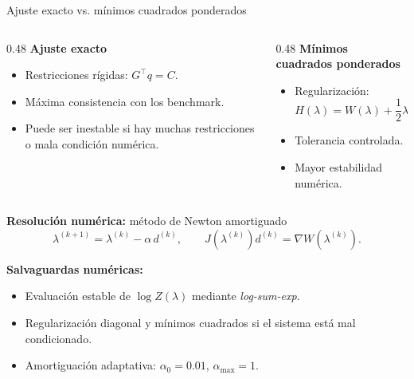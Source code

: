 \documentclass[8pt]{beamer}
\begin{document}
\begin{frame}{Ajuste exacto vs. mínimos cuadrados ponderados}
    \begin{columns}[T]
    \begin{column}{0.48\textwidth}
    \textbf{Ajuste exacto}
    \begin{itemize}
        \item Restricciones rígidas: $G^\top q = C$.
        \item Máxima consistencia con los benchmark.
        \item Puede ser inestable si hay muchas restricciones o mala condición numérica.
    \end{itemize}
    \end{column}
    \begin{column}{0.48\textwidth}
    \textbf{Mínimos cuadrados ponderados}
    \begin{itemize}
        \item Regularización:
        \[
            H(\lambda) = W(\lambda) + \frac{1}{2}\lambda^\top\Omega\lambda.
        \]
        \item Tolerancia controlada.
        \item Mayor estabilidad numérica.
    \end{itemize}
    \end{column}
    \end{columns}
    \pause
    
    \vspace{0.25cm}
    \textbf{Resolución numérica:} método de Newton amortiguado
    \[
        \lambda^{(k+1)} = \lambda^{(k)} - \alpha\, d^{(k)}, \qquad
        J(\lambda^{(k)})d^{(k)} = \nabla W(\lambda^{(k)}).
    \]
    \pause
    
    \textbf{Salvaguardas numéricas:}
    \begin{itemize}
        \item Evaluación estable de $\log Z(\lambda)$ mediante \textit{log-sum-exp}.
        \item Regularización diagonal y mínimos cuadrados si el sistema está mal condicionado.
        \item Amortiguación adaptativa: $\alpha_0 = 0.01$, $\alpha_{\max} = 1$.
    \end{itemize}
\end{frame}

\end{document}
